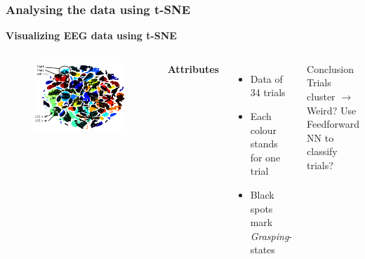 \documentclass{beamer}
\begin{document}
\begin{frame}
	\frametitle{Analysing the data using t-SNE}
	\textbf{Visualizing EEG data using t-SNE}
	\begin{columns}
		\begin{figure}[ht]
			\centering
			\includegraphics[width=1.0\textwidth, trim={0cm 0cm 0cm 0cm},clip]{images/eeg_tsne.png}
		\end{figure}
		
		\textbf{Attributes}
		\begin{itemize}
			\item Data of 34 trials
			\item Each colour stands for one trial
			\item Black spots mark \emph{Grasping}-states
		\end{itemize}
		\begin{block}{Conclusion}
			Trials cluster $\rightarrow$ Weird? Use Feedforward NN to classify trials?
		\end{block}		
	\end{columns}
\end{frame}
\end{document}
